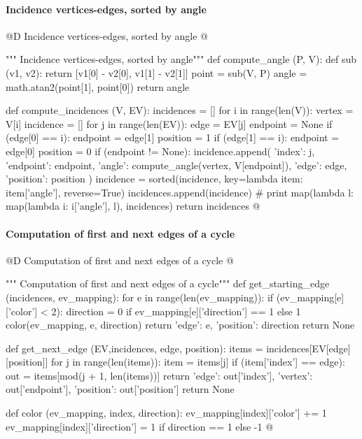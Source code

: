 \documentclass[11pt,oneside]{article}    %
\begin{document}
\paragraph{Incidence vertices-edges, sorted by angle}
@D Incidence vertices-edges, sorted by angle
@{""" Incidence vertices-edges, sorted by angle"""
def compute_angle (P, V):
    def sub (v1, v2):
        return [v1[0] - v2[0], v1[1] - v2[1]]
    point = sub(V, P)
    angle = math.atan2(point[1], point[0])
    return angle

def compute_incidences (V, EV):
    incidences = []
    for i in range(len(V)):
        vertex = V[i]
        incidence = []
        for j in range(len(EV)):
            edge = EV[j]
            endpoint = None
            if (edge[0] == i):
                endpoint = edge[1]
                position = 1
            if (edge[1] == i):
                endpoint = edge[0]
                position = 0
            if (endpoint != None):
                    incidence.append({
                        'index': j,
                        'endpoint': endpoint,
                        'angle': compute_angle(vertex, V[endpoint]),
                        'edge': edge,
                        'position': position
                    })
        incidence = sorted(incidence, key=lambda item: item['angle'], reverse=True)
        incidences.append(incidence)
    # print map(lambda l: map(lambda i: i['angle'], l), incidences)
    return incidences
@}

\paragraph{Computation of first and next edges of a cycle}
@D Computation of first and next edges of a cycle
@{""" Computation of first and next edges of a cycle"""
def get_starting_edge (incidences, ev_mapping):
    for e in range(len(ev_mapping)):
        if (ev_mapping[e]['color'] < 2):
            direction = 0 if ev_mapping[e]['direction'] == 1 else 1
            color(ev_mapping, e, direction)
            return {
                'edge': e,
                'position': direction }
    return None

def get_next_edge (EV,incidences, edge, position):
    items = incidences[EV[edge][position]]
    for j in range(len(items)):
        item = items[j]
        if (item['index'] == edge):
            out = items[mod(j + 1, len(items))]
            return {
                'edge': out['index'],
                'vertex': out['endpoint'],
                'position': out['position'] }
    return None

def color (ev_mapping, index, direction):
    ev_mapping[index]['color'] += 1
    ev_mapping[index]['direction'] = 1 if direction == 1 else -1
@}
\end{document}
